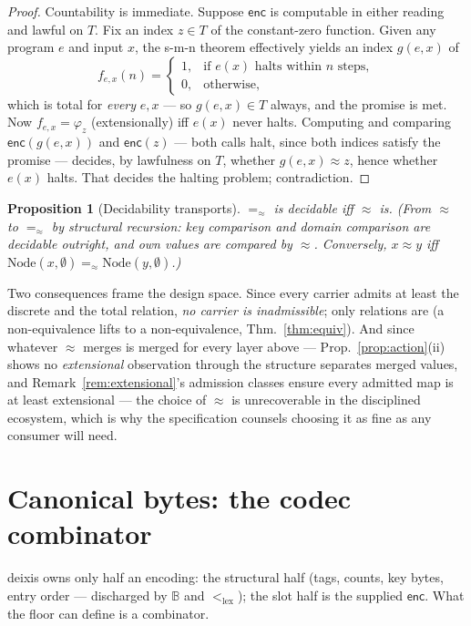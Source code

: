 \documentclass[11pt]{article}
\newtheorem{proposition}[theorem]{Proposition}
\theoremstyle{definition}
\newcommand{\Bytes}{\mathbb{B}}                    %
\newcommand{\eqS}{=_{\approx}}                     %
\newcommand{\lex}{<_{\mathrm{lex}}}
\newcommand{\enc}{\mathsf{enc}}
\begin{document}
\begin{proof}
Countability is immediate. Suppose $\enc$ is computable in either reading and lawful
on $T$. Fix an index $z \in T$ of the constant-zero function. Given any program $e$
and input $x$, the s-m-n theorem \cite{soare} effectively yields an index $g(e,x)$ of
\[
f_{e,x}(n) =
\begin{cases}
1, & \text{if } e(x) \text{ halts within } n \text{ steps},\\
0, & \text{otherwise,}
\end{cases}
\]
which is total for \emph{every} $e, x$ --- so $g(e,x) \in T$ always, and the promise
is met. Now $f_{e,x} = \varphi_z$ (extensionally) iff $e(x)$ never halts. Computing
and comparing $\enc(g(e,x))$ and $\enc(z)$ --- both calls halt, since both indices
satisfy the promise --- decides, by lawfulness on $T$, whether $g(e,x) \approx z$,
hence whether $e(x)$ halts. That decides the halting problem; contradiction.
\end{proof}

\begin{proposition}[Decidability transports]\label{prop:decidable}
$\eqS$ is decidable iff $\approx$ is. (From $\approx$ to $\eqS$ by structural recursion:
key comparison and domain comparison are decidable outright, and own values are compared
by $\approx$. Conversely, $x \approx y$ iff
$\mathrm{Node}(x, \emptyset) \eqS \mathrm{Node}(y, \emptyset)$.)
\end{proposition}

Two consequences frame the design space. Since every carrier admits at least the
discrete and the total relation, \emph{no carrier is inadmissible}; only relations are
(a non-equivalence lifts to a non-equivalence,
Thm.~\ref{thm:equiv}). And since whatever $\approx$ merges is merged for every layer
above --- Prop.~\ref{prop:action}(ii) shows no \emph{extensional} observation through
the structure separates merged values, and Remark~\ref{rem:extensional}'s admission
classes ensure every admitted map is at least extensional --- the choice of $\approx$
is unrecoverable in the disciplined ecosystem, which is why the specification
counsels choosing it as fine as any consumer will need.

\section{Canonical bytes: the codec combinator}\label{sec:codec}

deixis owns only half an encoding: the structural half (tags, counts, key bytes,
entry order --- discharged by $\Bytes$ and $\lex$); the slot half is the supplied
$\enc$. What the floor can define is a combinator.
\end{document}
